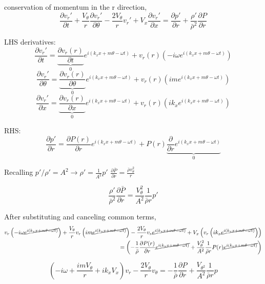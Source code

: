 \newpage
conservation of momentum in the r direction,
\[
\frac{\partial v_r'}{\partial t} +
\frac{V_{\theta}}{r} \frac{\partial v_r'}{\partial \theta} - \frac{2V_{\theta}}{r}v_r' + V_x\frac{\partial v_r'}{\partial x} = \frac{\partial p'}{\partial r} + \frac{\rho'}{\bar{\rho}^2}\frac{\partial P}{\partial r}
\]

LHS derivatives:
\[\frac{\partial v_r'}{\partial t} =
 \underbrace{\frac{\partial v_r(r)}{\partial t}}_{0} e^{i\left(k_x x + m \theta - \omega t \right)} +
  v_r(r) \left(-i\omega e^{i\left(k_x x + m \theta - \omega t \right)}\right) \]
\[\frac{\partial v_r'}{\partial \theta} = 
\underbrace{\frac{\partial v_r(r)}{\partial \theta}}_{0} e^{i\left(k_x x + m \theta - \omega t \right)} + v_r(r) \left(im e^{i\left(k_x x + m \theta - \omega t \right)}\right) \]
\[\frac{\partial v_r'}{\partial x} = \underbrace{\frac{\partial v_r(r)}{\partial x}}_{0} e^{i\left(k_x x + m \theta - \omega t \right)} + v_r(r) \left(ik_x e^{i\left(k_x x + m \theta - \omega t \right)}\right) \]

RHS:
\[\frac{\partial p'}{\partial r} = \frac{\partial P(r)}{\partial r} e^{i\left(k_x x + m \theta - \omega t \right)} + P(r)\underbrace{\frac{\partial}{\partial  r} e^{i\left(k_x x + m \theta - \omega t \right)}}_0 \]

Recalling $ p'/\rho' = A^2 \rightarrow \rho' = \frac{1}{A^2}p' $ $ \frac{\partial \bar{P}}{\partial r} = \frac{\bar{\rho} v_{\theta}^2}{r} $

\[\frac{\rho ' }{\bar{\rho}^2} \frac{ \partial \bar{P}}{\partial r} = \frac{V_{\theta}^2}{A^2}\frac{1}{\bar{\rho} r}p'\]


After substituting and canceling common terms,
\begin{align*}
 v_r \left(-i\omega \cancel{e^{i\left(k_x x + m \theta - \omega t \right)}}\right)+
\frac{V_{\theta}}{r} v_r \left(im \cancel{e^{i\left(k_x x + m \theta - \omega t \right)}}\right) -
\frac{2V_{\theta}}{r}v_r  \cancel{e^{i\left(k_x x + m \theta - \omega t \right)}} + V_x \left(v_r \left(ik_x \cancel{e^{i\left(k_x x + m \theta - \omega t \right)}}\right)\right) \\
=   \left(-\frac{1}{\bar{\rho}} \frac{\partial P(r)}{\partial r}\cancel{e^{i\left(k_x x + m \theta - \omega t \right)} } +  \frac{V_{\theta}^2}{A^2}\frac{1}{\bar{\rho} r} P(r)\cancel{e^{i\left(k_x x + m \theta - \omega t \right)} }\right) 
\end{align*}

\[\left(-i\omega + \frac{i m V_{\theta}}{r} + i k_x V_x \right) v_r - \frac{2 V_{\theta}}{r}v_{\theta}  = -\frac{1}{\bar{\rho}} \frac{\partial P}{\partial r}+ \frac{V_{\theta^2}}{A^2}\frac{1}{\bar{\rho} r}p\]

